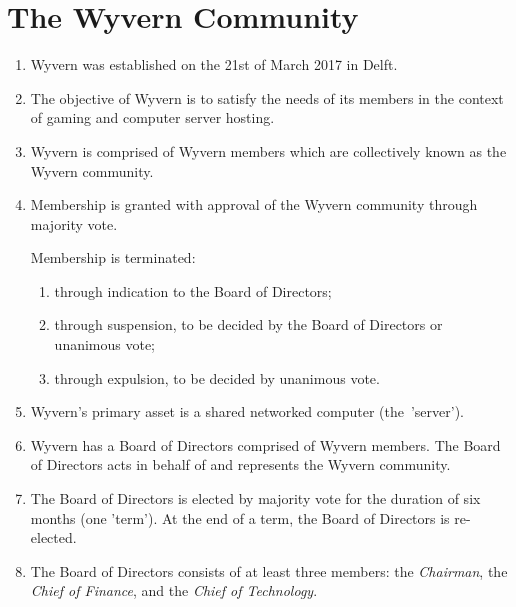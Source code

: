 \section{The Wyvern Community}
\label{sec:wyvern-community}
\begin{enumerate}
    \item Wyvern was established on the 21st of March 2017 in Delft.

    \item The objective of Wyvern is to satisfy the needs of its members in the context of gaming and computer server hosting.

    \item Wyvern is comprised of Wyvern members which are collectively known as the Wyvern community.

    \item Membership is granted with approval of the Wyvern community through majority vote.
    
    \begin{item}
        Membership is terminated:
        \begin{enumerate}
            \item through indication to the Board of Directors;
            \item through suspension, to be decided by the Board of Directors or unanimous vote;
            \item through expulsion, to be decided by unanimous vote.
        \end{enumerate}
    \end{item}

    \item Wyvern's primary asset is a shared networked computer (the~'server').

    \item Wyvern has a Board of Directors comprised of Wyvern members. The Board of Directors acts in behalf of and represents the Wyvern community.

    \item The Board of Directors is elected by majority vote for the duration of six months (one 'term'). At the end of a term, the Board of Directors is re-elected.

    \item The Board of Directors consists of at least three members: the \emph{Chairman}, the \emph{Chief of Finance}, and the \emph{Chief of Technology}.


\end{enumerate}
